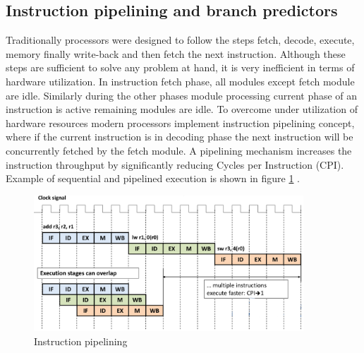 \subsection{Instruction pipelining and branch predictors}
Traditionally processors were designed to follow the steps fetch, decode, execute, memory finally write-back and then fetch the next instruction. Although these steps are sufficient to solve any problem at hand, it is very inefficient in terms of hardware utilization. In instruction fetch phase, all modules except fetch module are idle. Similarly during the other phases module processing current phase of an instruction is active remaining modules are idle. To overcome under utilization of hardware resources modern processors implement instruction pipelining concept, where if the current instruction is in decoding phase the next instruction will be concurrently fetched by the fetch module. A pipelining mechanism increases the instruction throughput by significantly reducing Cycles per Instruction (CPI). Example of sequential and pipelined execution is shown in figure \ref{fig:pipeline} \cite{SoCT}.

\begin{figure}[h]
	\centering
	\includegraphics[width=0.9\textwidth]{./figures/pipeline_seq2_edited.pdf}
	\caption{Instruction pipelining}
	\label{fig:pipeline}
\end{figure}

